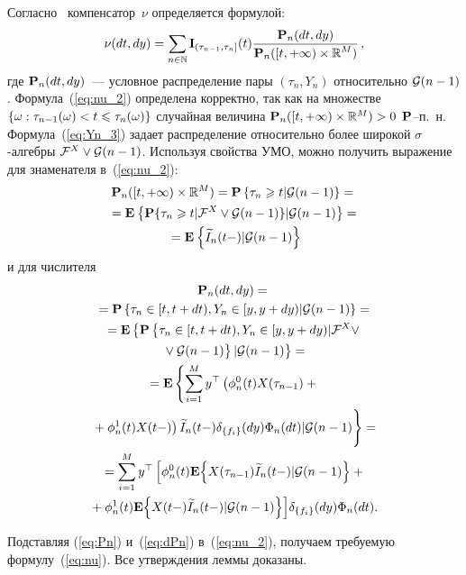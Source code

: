 \begin{multicols}{2}
{ Согласно~\cite{JSh_94} компенсатор~$\nu$ определяется формулой:
 \begin{equation}
 \nu(dt,dy) = \sum\limits_{n \in \mathbb{N}} \mathbf{I}_{(\tau_{n-1},\tau_n]}(t)
 \displaystyle\frac{\displaystyle {\mathbf P}_n(dt,dy)\mathstrut}{\displaystyle {\mathbf P}_n([t,+\infty)\times \mathbb{R}^M)\mathstrut}\,,
 \label{eq:nu_2}
 \end{equation}
 где ${\mathbf P}_n(dt,dy)$~--- условное распределение пары $(\tau_n,Y_n)$
 относительно ${\mathcal G}(n-1)$.
 Формула~(\ref{eq:nu_2}) определена корректно, так как
 на множестве $\{\omega: \tau_{n-1}(\omega) \hm< t \hm\leqslant \tau_{n}(\omega) \}$
 случайная величина
 $\pc_n([t,+\infty)\times \mathbb{R}^M)\hm > 0$ ${\mathbf P}$--п.~н.
 Формула~(\ref{eq:Yn_3}) задает распределение относительно более широкой
 $\sigma$-ал\-геб\-ры ${\mathcal F}^X \vee {\mathcal G}(n-1)$. Используя свойства УМО,
 можно получить выражение для знаменателя в~(\ref{eq:nu_2}):
 \begin{multline}
 {\mathbf P}_n([t,+\infty)\times \mathbb{R}^M) =
 \mathbf{P}\left\{ \tau_n \geqslant t|{\mathcal G}(n-1) \right\}={}\\
 {}= \mathbf{E}_{  }\left\{ \mathop{{\mathbf P} \{\tau_n \geqslant t|{\mathcal F}^X \vee {\mathcal G}(n-1)\}|{\mathcal G}(n-1)} \right\}={}\\
 {}=
 \mathbf{E}_{  }\left\{ \mathop{\widetilde{I}_n(t-)|{\mathcal G}(n-1)} \right\}
 \label{eq:Pn}
 \end{multline}
  и для числителя
  \begin{multline}
\pc_n(dt,dy) ={}\\
{}= \pp{\tau_n \in [t,t+dt), Y_n \in [y,y+dy)|\G(n-1)}={} \\
 {}=  \mathbf{E}\left\{\pc\left\{\tau_n \in [t,t+dt), Y_n \in [y,y+dy)|\ff^X \vee\right.\right.{}\\
\left. \left.{}\vee
 \G(n-1)  \vphantom{\ff^X}
 \right\}|\G(n-1)\right\} ={}\\
 {}=  \mathbf{E}\left\{  \sum\limits_{i=1}^M y^{\top} \left(
 \phi_n^0(t)X(\tau_{n-1})+{}\right.\right.\\
\left.\left. {}+\phi_n^1(t)X(t-)
 \right)\widetilde{I}_n(t-) \delta_{\{f_i\}}(dy)\Phi_n(dt)
 |\G(n-1)
 \vphantom{\sum\limits_{i=1}^M}\right\} ={} \\
 {}=  \sum\limits_{i=1}^M y^{\top}
 \left[
 \phi_n^0(t)\mathbf{E}\!\left\{ X(\tau_{n-1})\widetilde{I}_n(t-)|\G(n-1)\right\}
 +{} \right. \\
\hspace*{-2.5mm}\left.{} +
 \phi_n^1(t)\mathbf{E}\!\left\{ X(t-)\widetilde{I}_n(t-)|\G(n-1)\right\}
 \right]\!\delta_{\{f_i\}}(dy)\Phi_n(dt).\!\!\!
 \label{eq:dPn}
 \end{multline}

 Подставляя (\ref{eq:Pn}) и~(\ref{eq:dPn}) в~(\ref{eq:nu_2}), получаем
 требуемую формулу~(\ref{eq:nu}). Все утверждения леммы доказаны.

}
\end{multicols}
